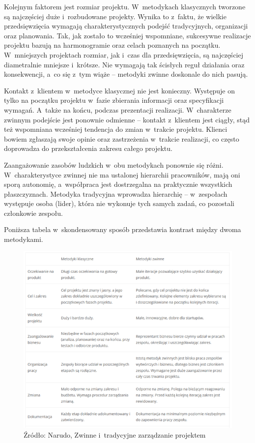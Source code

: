\documentclass[oneside,polski,logo]{amuthesis}
\begin{document}
Kolejnym faktorem jest rozmiar projektu. W~metodykach klasycznych tworzone są najczęściej duże i~rozbudowane projekty. Wynika to z~faktu, że wielkie przedsięwzięcia wymagają charakterystycznych podejść tradycyjnych, organizacji oraz planowania. Tak, jak zostało to wcześniej wspomniane, sukcesywne realizacje projektu bazują na harmonogramie oraz celach poznanych na początku. W~mniejszych projektach rozmiar, jak i~czas dla przedsięwzięcia, są najczęściej diametralnie mniejsze i~krótsze. Nie wymagają tak ścisłych reguł działania oraz konsekwencji, a~co się z~tym wiąże – metodyki zwinne doskonale do nich pasują.

Kontakt z~klientem w~metodyce klasycznej nie jest konieczny. Występuje on tylko na początku projektu w~fazie zbierania informacji oraz specyfikacji wymagań. A~także na końcu, podczas prezentacji realizacji. W~charakterze zwinnym podejście jest ponownie odmienne – kontakt z~klientem jest ciągły, stąd też wspomniana wcześniej tendencja do zmian w~trakcie projektu. Klienci bowiem zgłaszają swoje opinie oraz zastrzeżenia w~trakcie realizacji, co często doprowadza do przekształcenia zakresu całego projektu.

Zaangażowanie zasobów ludzkich w~obu metodykach ponownie się różni. W~charakterystyce zwinnej nie ma ustalonej hierarchii pracowników, mają oni sporą autonomię, a~współpraca jest dostrzegalna na praktycznie wszystkich płaszczyznach. Metodyka tradycyjna wprowadza hierarchię – w~zespołach występuje osoba (lider), która nie wykonuje tych samych zadań, co pozostali członkowie zespołu. \cite{modele} \cite{agileVwaterfall}

Poniższa tabela w~skondensowany sposób przedstawia kontrast między dwoma metodykami.

\begin{figure}[h]
	\centering
	\includegraphics[width=13cm]{images/hyps/zwinne-tradycyjne.png}
	\caption{Źródło: Narudo, Zwinne i~tradycyjne zarządzanie projektem}
\end{figure}
\end{document}
